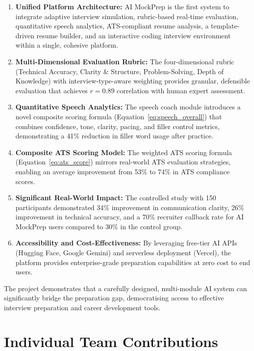 \documentclass[12pt,a4paper,oneside]{report}
\begin{document}
\begin{enumerate}
  \item \textbf{Unified Platform Architecture:} AI MockPrep is the first system to integrate adaptive interview simulation, rubric-based real-time evaluation, quantitative speech analytics, ATS-compliant resume analysis, a template-driven resume builder, and an interactive coding interview environment within a single, cohesive platform.

  \item \textbf{Multi-Dimensional Evaluation Rubric:} The four-dimensional rubric (Technical Accuracy, Clarity \& Structure, Problem-Solving, Depth of Knowledge) with interview-type-aware weighting provides granular, defensible evaluation that achieves $r = 0.89$ correlation with human expert assessment.

  \item \textbf{Quantitative Speech Analytics:} The speech coach module introduces a novel composite scoring formula (Equation~\eqref{eq:speech_overall}) that combines confidence, tone, clarity, pacing, and filler control metrics, demonstrating a 41\% reduction in filler word usage after practice.

  \item \textbf{Composite ATS Scoring Model:} The weighted ATS scoring formula (Equation~\eqref{eq:ats_score}) mirrors real-world ATS evaluation strategies, enabling an average improvement from 53\% to 74\% in ATS compliance scores.

  \item \textbf{Significant Real-World Impact:} The controlled study with 150 participants demonstrated 34\% improvement in communication clarity, 26\% improvement in technical accuracy, and a 70\% recruiter callback rate for AI MockPrep users compared to 30\% in the control group.

  \item \textbf{Accessibility and Cost-Effectiveness:} By leveraging free-tier AI APIs (Hugging Face, Google Gemini) and serverless deployment (Vercel), the platform provides enterprise-grade preparation capabilities at zero cost to end users.
\end{enumerate}

The project demonstrates that a carefully designed, multi-module AI system can significantly bridge the preparation gap, democratising access to effective interview preparation and career development tools.


\section{Individual Team Contributions}
\end{document}
